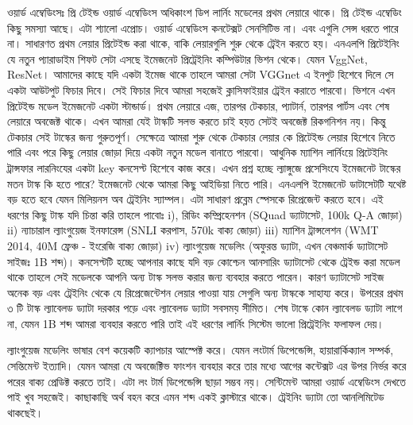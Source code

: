 \documentclass{article}[book]
\begin{document}
ওয়ার্ড এম্বেডিংসঃ প্রি টেইন্ড ওয়ার্ড এম্বেডিংস অধিকাংশ ডিপ লার্নিং মডেলের প্রথম লেয়ারে থাকে। প্রি টেইন্ড এম্বেডিং কিছু সমস্যা আছে। এটা শ্যালো এপ্রোচ। ওয়ার্ড এম্বেডিংস কনটেক্সট সেনসিটিভ না। এবং এগুলি সেন্স ধরতে পারে না। সাধারণত প্রথম লেয়ার প্রিটেইন্ড করা থাকে, বাকি লেয়ারগুলি শুরু থেকে ট্রেইন করতে হয়। এনএলপি প্রিটেইনিং যে নতুন প্যারাডাইম শিফট সেটা এসছে ইমেজনেট প্রিট্রেইনিং কম্পিউটার ভিশন থেকে। যেমন VggNet, ResNet। আমাদের কাছে যদি একটা ইমেজ থাকে তাহলে আমরা সেটা VGGnet এ ইনপুট হিশেবে দিলে সে একটা আউটপুট ফিচার দিবে। সেই ফিচার দিবে আমরা সহজেই ক্লাসিফাইয়ার ট্রেইন করাতে পারবো। ভিশনে এখন প্রিটেইন্ড মডেল ইমেজনেট একটা স্টান্ডার্ড। প্রথম লেয়ারে এজ, তারপর টেকচার, প্যাটার্ন, তারপর পার্টস এবং শেষ লেয়ারে অবজেক্ট থাকে। এখন আমরা যেই টাস্কটি সলভ করতে চাই হয়ত সেটই অবজেক্ট রিকগনিশন নয়। কিন্তু টেকচার সেই টাস্কের জন্য গুরুতপূর্ণ। সেক্ষেত্রে আমরা শুরু থেকে টেকচার লেয়ার কে প্রিটেইন্ড লেয়ার হিশেবে নিতে পারি এবং পরে কিছু লেয়ার জোড়া দিয়ে একটা নতুন মডেল বানাতে পারবো। আধুনিক ম্যাশিন লার্নিংয়ে প্রিটেইনিং ট্রান্সফার লারনিংযের একটা key কনসেপ্ট হিশেবে কাজ করে। এখন প্রশ্ন হচ্ছে ল্যাঙ্গুজে প্রসেসিংযে ইমেজনেট টাস্কের মতন টাস্ক কি হতে পারে? ইমেজনেট থেকে আমরা কিছু আইডিয়া নিতে পারি। এনএলপি ইমেজনেট ডাটাসেটটি যথেষ্ট বড় হতে হবে যেমন মিলিয়নস অব ট্রেইনিং স্যাম্পল। এটা সাধারণ প্রব্লেম স্পেসকে রিপ্রেজেন্ট করতে হবে। এই ধরণের কিছু টাস্ক যদি চিন্তা করি তাহলে পাবোঃ i), রিডিং কম্প্রিহেনশন (SQuad ড্যাটাসেট, 100k Q-A জোড়া)  ii) ন্যাচারাল ল্যাংগুয়েজ ইনফারেন্স (SNLI করপাস, 570k বাক্য জোড়া) iii) ম্যাশিন ট্রান্সলেশন (WMT 2014, 40M ফ্রেঞ্চ - ইংরেজি বাক্য জোড়া)  iv) ল্যাংগুয়েজ মডেলিং (অফুরন্ত ড্যাটা, এখন বেঞ্চমার্ক ড্যাটাসেট সাইজঃ 1B শব্দ)। কনসেপ্টটি হচ্ছে আপনার কাছে যদি বড় কোশ্চেন আনসারিং ড্যাটাসেট থেকে ট্রেইন্ড করা মডেল থাকে তাহলে সেই মডেলকে আপনি অন্য টাস্ক সলভ করার জন্য ব্যবহার করতে পারেন। কারণ ড্যাটাসেট সাইজ অনেক বড় এবং ট্রেইনিং থেকে যে রিপ্রেজেন্টেশন লেয়ার পাওয়া যায় সেগুলি অন্য টাস্ককে সাহায্য করে। উপরের প্রথম ৩ টি টাস্ক ল্যাবেলড ড্যাটা দরকার পড়ে এবং ল্যাবেলড ড্যাটা সবসময় সীমিত। শেষ টাস্কে কোন ল্যাবেলড ড্যাটা লাগে না, যেমন 1B শব্দ আমরা ব্যবহার করতে পারি তাই এই ধরণের লার্নিং সিস্টেম ভালো প্রিট্রেইনিং ফলাফল দেয়। 

ল্যাংগুয়েজ মডেলিং ভাষার বেশ কয়েকটি ক্যাপচার আস্পেক্ট করে। যেমন লংটার্ম ডিপেন্ডেন্সি, হায়ারার্কিক্যাল সম্পর্ক, সেন্তিমেন্ট ইত্যাদি। যেমন আমরা যে অবজেক্টিভ ফাংশন ব্যবহার করে তার মধ্যে আগের কন্টেক্সট এর উপর নির্ভর করে পরের বাক্য প্রেডিক্ট করতে তাই। এটা লং টার্ম ডিপেন্ডেন্সি ছাড়া সম্ভব নয়। সেন্টিমেন্ট আমরা ওয়ার্ড এম্বেডিংস দেখতে পাই খুব সহজেই। কাছাকাছি অর্থ বহন করে এমন শব্দ একই ক্লাস্টারে থাকে। ট্রেইনিং ড্যাটা তো আনলিমিটেড থাকছেই।  
\end{document}
